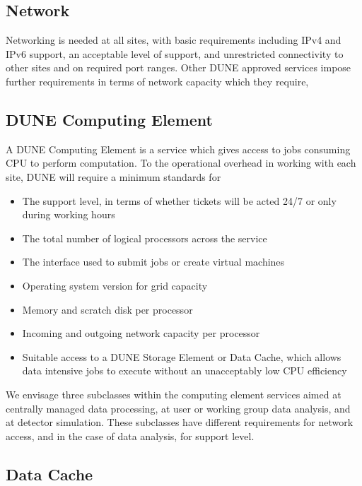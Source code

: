 \subsection{Network}
\label{sec:cm:network}

Networking is needed at all sites, with basic requirements including IPv4 and IPv6 support, an acceptable level of support, and unrestricted connectivity to other sites and on required port ranges. Other DUNE approved services impose further requirements in terms of network capacity which they require,

\subsection{DUNE Computing Element}
\label{sec:cm:dce}

A DUNE Computing Element is a service which gives access to jobs consuming CPU to perform computation. To the operational overhead in working with each site, DUNE will require a minimum standards for

\begin{itemize}
    \item The support level, in terms of whether tickets will be acted 24/7 or only during working hours
    \item The total number of logical processors across the service
    \item The interface used to submit jobs or create virtual machines
    \item Operating system version for grid capacity
    \item Memory and scratch disk per processor
    \item Incoming and outgoing network capacity per processor
    \item Suitable access to a DUNE Storage Element or Data Cache, which allows data intensive jobs to execute without an unacceptably low CPU efficiency
\end{itemize}

We envisage three subclasses within the computing element services aimed at centrally managed data processing, at user or working group data analysis, and at detector simulation. These subclasses have different requirements for network access, and in the case of data analysis, for support level.

\subsection{Data Cache}
\label{sec:cm:data_cache}

